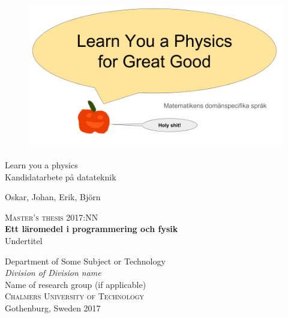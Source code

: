 
\begin{titlepage}
			
\addtolength{\voffset}{2cm}

\begin{figure}[H]
\centering
\vspace{2cm}	%
\includegraphics[width=0.9\linewidth]{figure/LearnYouAPhysics.png}
\end{figure}

\mbox{}
\vfill
\renewcommand{\familydefault}{\sfdefault} \normalfont %
{\Large Learn you a physics}\\[0.5cm]
Kandidatarbete på datateknik\setlength{\parskip}{1cm}

{\Large Oskar, Johan, Erik, Björn} \setlength{\parskip}{2.9cm}


\renewcommand{\familydefault}{\rmdefault} \normalfont %
\end{titlepage}


\newpage
\restoregeometry
\thispagestyle{empty}
\mbox{}


\newpage
\thispagestyle{empty}
\begin{center}
	\textsc{\large Master's thesis 2017:NN}\\[4cm]		%
	\textbf{\Large Ett läromedel i programmering och fysik} \\[1cm]
	{\large Undertitel}\\[1cm]
	
	\vfill	
	
	Department of Some Subject or Technology \\
	\emph{Division of Division name}\\
	Name of research group (if applicable)\\
	\textsc{Chalmers University of Technology} \\
	Gothenburg, Sweden 2017 \\
\end{center}


